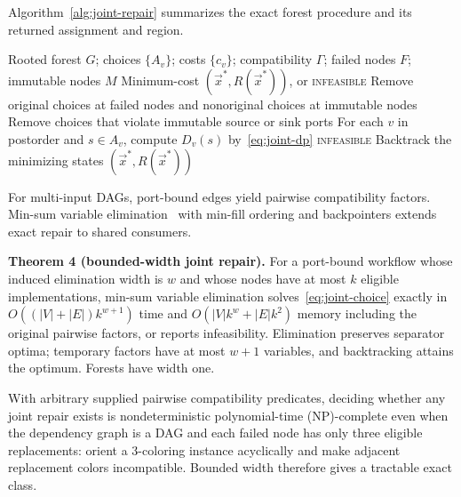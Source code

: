 Algorithm~\ref{alg:joint-repair} summarizes the exact forest procedure and its
returned assignment and region.

\begin{algorithm}[!b]
\caption{\textsc{ExactJointRepair} on a forest}
\label{alg:joint-repair}
\footnotesize
\begin{algorithmic}[1]
\REQUIRE Rooted forest $G$; choices $\{A_v\}$; costs $\{c_v\}$;
compatibility $\Gamma$; failed nodes $F$; immutable nodes $M$
\ENSURE Minimum-cost $(\vec{x}^{*},R(\vec{x}^{*}))$, or
\textsc{infeasible}
\STATE Remove original choices at failed nodes and nonoriginal choices at
immutable nodes
\STATE Remove choices that violate immutable source or sink ports
\STATE For each $v$ in postorder and $s\in A_v$, compute $D_v(s)$
by~\eqref{eq:joint-dp}
  \RETURN \textsc{infeasible}
\ENDIF
\STATE Backtrack the minimizing states
\RETURN $(\vec{x}^{*},R(\vec{x}^{*}))$
\end{algorithmic}
\end{algorithm}

For multi-input DAGs, port-bound edges yield pairwise compatibility factors.
Min-sum variable elimination~\cite{dechter1999bucket} with min-fill ordering
and backpointers extends exact repair to shared consumers.

\textbf{Theorem 4 (bounded-width joint repair).}
For a port-bound workflow whose induced elimination width is $w$ and whose
nodes have at most $k$ eligible implementations, min-sum variable elimination
solves~\eqref{eq:joint-choice} exactly in
$O((|V|+|E|)k^{w+1})$ time and
$O(|V|k^w+|E|k^2)$ memory including the original pairwise factors,
or reports infeasibility.
Elimination preserves separator optima; temporary factors have at most $w+1$
variables, and backtracking attains the optimum. Forests have width one.

With arbitrary supplied pairwise compatibility predicates, deciding whether
any joint repair exists is nondeterministic polynomial-time (NP)-complete even when the dependency graph is a
DAG and each failed node has only three eligible replacements: orient a
3-coloring instance acyclically and make adjacent replacement colors
incompatible. Bounded width therefore gives a tractable exact class.
